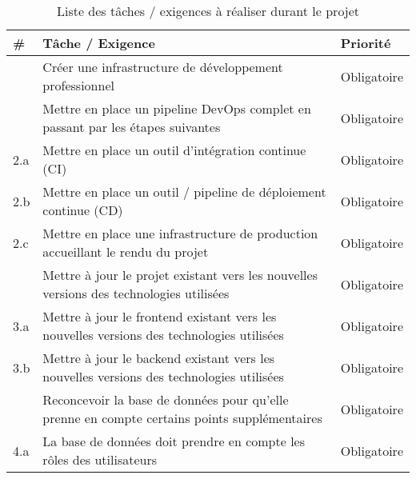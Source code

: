 \documentclass[
    iai, %
    il, %
]{heig-tb}
\begin{document}
\begin{table}[h]
    \begin{center}
        \caption{Liste des tâches / exigences à réaliser durant le projet \label{taches}}
        \begin{tabularx}{1.0\textwidth} {
                | >{\centering\arraybackslash}X
                | >{\centering\arraybackslash}X
                | >{\centering\arraybackslash}X |}
            \#  & Tâche / Exigence                                                                                                       & Priorité      \\ \hline
            1   & Créer une infrastructure de développement professionnel                                                                & Obligatoire   \\
            2   & Mettre en place un pipeline DevOps complet en passant par les étapes suivantes                                         & Obligatoire   \\
            2.a & Mettre en place un outil d'intégration continue (CI)                                                                   & Obligatoire   \\
            2.b & Mettre en place un outil / pipeline de déploiement continue (CD)                                                       & Obligatoire   \\
            2.c & Mettre en place une infrastructure de production accueillant le rendu du projet                                        & Obligatoire   \\
            3   & Mettre à jour le projet existant vers les nouvelles versions des technologies utilisées                                & Obligatoire   \\
            3.a & Mettre à jour le frontend existant vers les nouvelles versions des technologies utilisées                              & Obligatoire   \\
            3.b & Mettre à jour le backend existant vers les nouvelles versions des technologies utilisées                               & Obligatoire   \\
            4   & Reconcevoir la base de données pour qu'elle prenne en compte certains points supplémentaires                           & Obligatoire   \\
            4.a & La base de données doit prendre en compte les rôles des utilisateurs                                                   & Obligatoire   \\

\end{tabularx}
\end{center}
\end{table}
\end{document}

